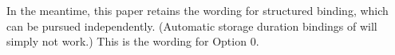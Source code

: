 \documentclass{wg21}
\begin{document}
In the meantime, this paper retains the wording for  structured binding, which can be pursued independently. (Automatic storage duration bindings of  will simply not work.) This is the wording for Option 0.
%
%
%
%
%
%
%
%
%
%
%
%
%
\end{document}
